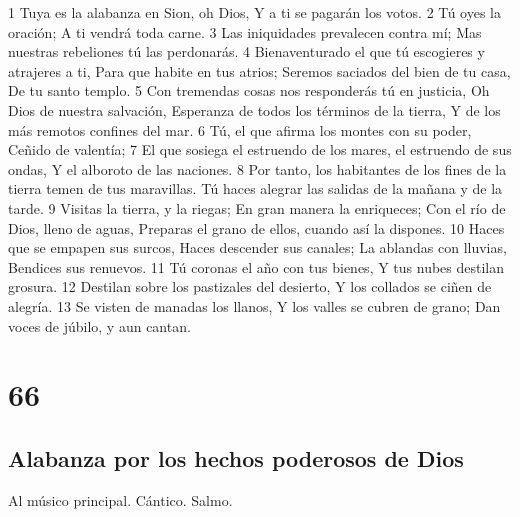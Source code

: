 1 Tuya es la alabanza en Sion, oh Dios,
Y a ti se pagarán los votos.
2 Tú oyes la oración;
A ti vendrá toda carne.
3 Las iniquidades prevalecen contra mí;
Mas nuestras rebeliones tú las perdonarás.
4 Bienaventurado el que tú escogieres y atrajeres a ti,
Para que habite en tus atrios;
Seremos saciados del bien de tu casa,
De tu santo templo.
5 Con tremendas cosas nos responderás tú en justicia,
Oh Dios de nuestra salvación,
Esperanza de todos los términos de la tierra,
Y de los más remotos confines del mar.
6 Tú, el que afirma los montes con su poder,
Ceñido de valentía;
7 El que sosiega el estruendo de los mares, el estruendo de sus ondas,
Y el alboroto de las naciones.
8 Por tanto, los habitantes de los fines de la tierra temen de tus maravillas.
Tú haces alegrar las salidas de la mañana y de la tarde.
9 Visitas la tierra, y la riegas;
En gran manera la enriqueces;
Con el río de Dios, lleno de aguas,
Preparas el grano de ellos, cuando así la dispones.
10 Haces que se empapen sus surcos,
Haces descender sus canales;
La ablandas con lluvias,
Bendices sus renuevos.
11 Tú coronas el año con tus bienes,
Y tus nubes destilan grosura.
12 Destilan sobre los pastizales del desierto,
Y los collados se ciñen de alegría.
13 Se visten de manadas los llanos,
Y los valles se cubren de grano;
Dan voces de júbilo, y aun cantan.

\chapter{66}

\section*{Alabanza por los hechos poderosos de Dios}

Al músico principal. Cántico. Salmo.

